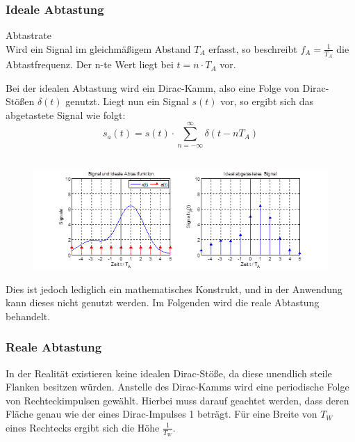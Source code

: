 \subsubsection{Ideale Abtastung}
\begin{definition}{Abtastrate}\\
Wird ein Signal im gleichmäßigem Abstand $T_A$ erfasst, so beschreibt $f_A = \frac{1}{T_A}$ die Abtastfrequenz. Der n-te Wert liegt bei $t = n \cdot T_A$ vor.
\end{definition}

Bei der idealen Abtastung wird ein Dirac-Kamm, also eine Folge von Dirac-Stößen $\delta(t)$ genutzt. Liegt nun ein Signal $s(t)$ vor, so ergibt sich das abgetastete Signal wie folgt:\\
$$s_a(t) = s(t) \cdot \sum_{n=-\infty}^{\infty} \delta(t - nT_A)$$\\

\begin{figure}[h!]
\centering
\includegraphics[scale=1]{images/abtastung_ideal.png}
\label{ideal_abtastung}
\end{figure}


Dies ist jedoch lediglich ein mathematisches Konstrukt, und in der Anwendung kann dieses nicht genutzt werden. Im Folgenden wird die reale Abtastung behandelt.

\subsubsection{Reale Abtastung}
In der Realität existieren keine idealen Dirac-Stöße, da diese unendlich steile Flanken besitzen würden. Anstelle des Dirac-Kamms wird eine periodische Folge von Rechteckimpulsen gewählt. Hierbei muss darauf geachtet werden, dass deren Fläche genau wie der eines Dirac-Impulses 1 beträgt. Für eine Breite von $T_W$ eines Rechtecks ergibt sich die Höhe $\frac{1}{T_W}$.\\

